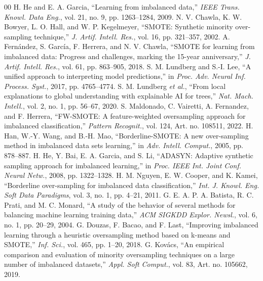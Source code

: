 \documentclass[conference,a4paper]{IEEEtran}
\begin{document}
\begin{thebibliography}{00}
 H. He and E. A. Garcia, ``Learning from imbalanced data,'' \textit{IEEE Trans. Knowl. Data Eng.}, vol. 21, no. 9, pp. 1263--1284, 2009.
 N. V. Chawla, K. W. Bowyer, L. O. Hall, and W. P. Kegelmeyer, ``SMOTE: Synthetic minority over-sampling technique,'' \textit{J. Artif. Intell. Res.}, vol. 16, pp. 321--357, 2002.
 A. Fern\'andez, S. Garc\'ia, F. Herrera, and N. V. Chawla, ``SMOTE for learning from imbalanced data: Progress and challenges, marking the 15-year anniversary,'' \textit{J. Artif. Intell. Res.}, vol. 61, pp. 863--905, 2018.
 S. M. Lundberg and S.-I. Lee, ``A unified approach to interpreting model predictions,'' in \textit{Proc. Adv. Neural Inf. Process. Syst.}, 2017, pp. 4765--4774.
 S. M. Lundberg \textit{et al.}, ``From local explanations to global understanding with explainable AI for trees,'' \textit{Nat. Mach. Intell.}, vol. 2, no. 1, pp. 56--67, 2020.
 S. Maldonado, C. Vairetti, A. Fernandez, and F. Herrera, ``FW-SMOTE: A feature-weighted oversampling approach for imbalanced classification,'' \textit{Pattern Recognit.}, vol. 124, Art. no. 108511, 2022.
 H. Han, W.-Y. Wang, and B.-H. Mao, ``Borderline-SMOTE: A new over-sampling method in imbalanced data sets learning,'' in \textit{Adv. Intell. Comput.}, 2005, pp. 878--887.
 H. He, Y. Bai, E. A. Garcia, and S. Li, ``ADASYN: Adaptive synthetic sampling approach for imbalanced learning,'' in \textit{Proc. IEEE Int. Joint Conf. Neural Netw.}, 2008, pp. 1322--1328.
 H. M. Nguyen, E. W. Cooper, and K. Kamei, ``Borderline over-sampling for imbalanced data classification,'' \textit{Int. J. Knowl. Eng. Soft Data Paradigms}, vol. 3, no. 1, pp. 4--21, 2011.
 G. E. A. P. A. Batista, R. C. Prati, and M. C. Monard, ``A study of the behavior of several methods for balancing machine learning training data,'' \textit{ACM SIGKDD Explor. Newsl.}, vol. 6, no. 1, pp. 20--29, 2004.
 G. Douzas, F. Bacao, and F. Last, ``Improving imbalanced learning through a heuristic oversampling method based on k-means and SMOTE,'' \textit{Inf. Sci.}, vol. 465, pp. 1--20, 2018.
 G. Kov\'acs, ``An empirical comparison and evaluation of minority oversampling techniques on a large number of imbalanced datasets,'' \textit{Appl. Soft Comput.}, vol. 83, Art. no. 105662, 2019.

\end{thebibliography}
\end{document}
